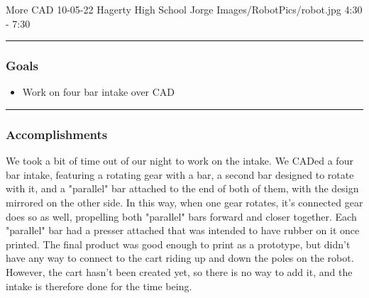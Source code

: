 \insertmeeting 
	{More CAD} 
	{10-05-22}
	{Hagerty High School}
	{Jorge}
	{Images/RobotPics/robot.jpg}
	{4:30 - 7:30}
	
\noindent\hfil\rule{\textwidth}{.4pt}\hfil
\subsubsection*{Goals}
\begin{itemize}
    \item Work on four bar intake over CAD

\end{itemize} 

\noindent\hfil\rule{\textwidth}{.4pt}\hfil

\subsubsection*{Accomplishments}
We took a bit of time out of our night to work on the intake. We CADed a four bar intake, featuring a rotating gear with a bar, a second bar designed to rotate with it, and a "parallel" bar attached to the end of both of them, with the design mirrored on the other side. In this way, when one gear rotates, it's connected gear does so as well, propelling both "parallel" bars forward and closer together. Each "parallel" bar had a presser attached that was intended to have rubber on it once printed. The final product was good enough to print as a prototype, but didn't have any way to connect to the cart riding up and down the poles on the robot. However, the cart hasn't been created yet, so there is no way to add it, and the intake is therefore done for the time being.




